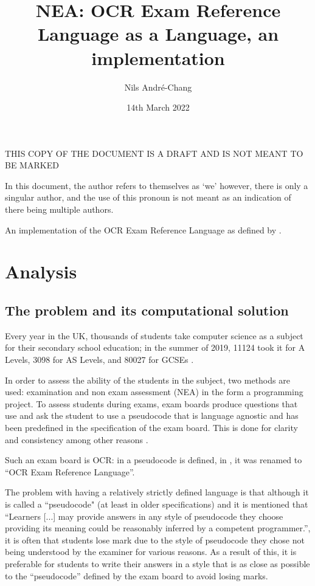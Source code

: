 \documentclass{article}
\author{Nils André-Chang}
\title{NEA: OCR Exam Reference Language as a Language, an implementation}
\date{14th March 2022}
\begin{document}
{\huge THIS COPY OF THE DOCUMENT IS A DRAFT AND IS NOT MEANT TO BE MARKED}

\maketitle

\tableofcontents

\listoffigures

\listoflistings

\listoftables

In this document, the author refers to themselves as `we' however, there is
only a singular author, and the use of this pronoun is not meant as an
indication of there being multiple authors.

An implementation of the OCR Exam Reference Language as defined by
\textcite{j277, h446}.

\section{Analysis}

\subsection{The problem and its computational solution}

Every year in the UK, thousands of students take computer science as a subject
for their secondary school education; in the summer of 2019, 11124 took it for
A Levels, 3098 for AS Levels, and 80027 for GCSEs
\cite{jcqalevel19, jcqgcse19}.

In order to assess the ability of the students in the subject, two methods are
used: examination and non exam assessment (NEA) in the form a programming
project. To assess students during exams, exam boards produce questions that
use and ask the student to use a pseudocode that is language agnostic and has
been predefined in the specification of the exam board. This is done for
clarity and consistency among other reasons \cite{h446, j276, j277}.

Such an exam board is OCR: in \textcite{h446, j276, j277} a pseudocode is
defined, in \textcite{j277}, it was renamed to ``OCR Exam Reference Language''.

The problem with having a relatively strictly defined language is that although
it is called a ``pseudocode" (at least in older specifications) and it is
mentioned that ``Learners [...] may provide answers in any style of pseudocode
they choose providing its meaning could be reasonably inferred by a competent
programmer.'', it is often that students lose mark due to the style of
pseudocode they chose not being understood by the examiner for various reasons.
As a result of this, it is preferable for students to write their answers in a
style that is as close as possible to the ``pseudocode'' defined by the exam
board to avoid losing marks.
\end{document}
